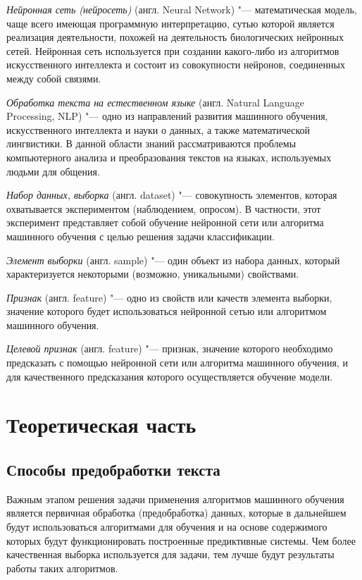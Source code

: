 \documentclass[bachelor, och, coursework]{SCWorks}
\begin{document}
    \textit{Нейронная сеть (нейросеть)} (англ. Neural Network) "---
    математическая модель, чаще всего имеющая программную интерпретацию, сутью
    которой является реализация деятельности, похожей на деятельность
    биологических нейронных сетей. Нейронная сеть используется при создании
    какого-либо из алгоритмов искусственного интеллекта и состоит из
    совокупности нейронов, соединенных между собой связями. 

    \textit{Обработка текста на естественном языке} (англ. Natural Language\\
    Processing, NLP) "--- одно из направлений развития машинного обучения,
    искусственного интеллекта и науки о данных, а также математической
    лингвистики. В данной области знаний рассматриваются проблемы компьютерного
    анализа и преобразования текстов на языках, используемых людьми для общения.

    \textit{Набор данных, выборка} (англ. dataset) "--- совокупность элементов,
    которая охватывается экспериментом (наблюдением, опросом). В частности, этот
    эксперимент представляет собой обучение нейронной сети или алгоритма
    машинного обучения с целью решения задачи классификации.

    \textit{Элемент выборки} (англ. sample) "--- один объект из набора данных,
    который характеризуется некоторыми (возможно, уникальными) свойствами.

    \textit{Признак} (англ. feature) "--- одно из свойств или качеств элемента
    выборки, значение которого будет использоваться нейронной сетью или
    алгоритмом машинного обучения.

    \textit{Целевой признак} (англ. feature) "--- признак, значение которого
    необходимо предсказать с помощью нейронной сети или алгоритма машинного
    обучения, и для качественного предсказания которого осуществляется обучение
    модели.


\section{Теоретическая часть}

    \subsection{Способы предобработки текста}

        Важным этапом решения задачи применения алгоритмов машинного обучения
        является первичная обработка (предобработка) данных, которые в
        дальнейшем будут использоваться алгоритмами для обучения и на основе
        содержимого которых будут функционировать построенные предиктивные
        системы. Чем более качественная выборка используется для задачи, тем
        лучше будут результаты работы таких алгоритмов.
\end{document}
